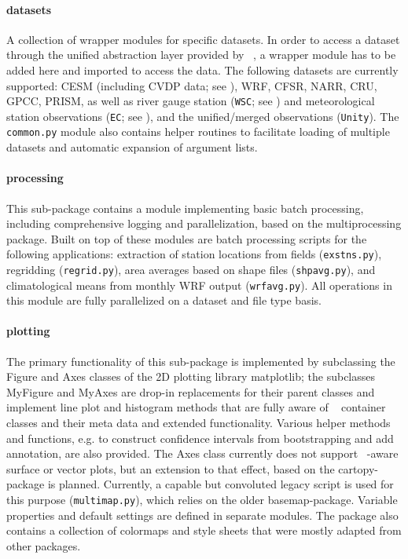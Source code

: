 \documentclass[letterpaper,12pt,headsepline,final]{scrartcl} %
\newcommand{\geopy}{\mbox{\color{teal} \sffamily {GeoPy}}}
\begin{document}
\paragraph{\color{blue} \ttfamily datasets} A collection of wrapper modules for specific datasets. In order to access a dataset through the unified abstraction layer provided by \geopy{}, a wrapper module has to be added here and imported to access the data. The following datasets are currently supported: CESM (including CVDP data; see \citealp[][\S2.1.5]{erler2015phd}), WRF, CFSR, NARR, CRU, GPCC, PRISM, as well as river gauge station (\texttt{WSC}; see \citealp[][\S2.1.3]{erler2015phd}) and meteorological station observations (\texttt{EC}; see \citealp[][\S2.1.4]{erler2015phd}), and the unified/merged observations (\texttt{Unity}).
The \texttt{common.py} module also contains helper routines to facilitate loading of multiple datasets and automatic expansion of argument lists.

\paragraph{\color{violet} \ttfamily processing} This sub-package contains a module implementing basic batch processing, including comprehensive logging and parallelization, based on the \textsf{multiprocessing} package. Built on top of these modules are batch processing scripts for the following applications: extraction of station locations from fields (\texttt{exstns.py}), regridding (\texttt{regrid.py}), area averages based on shape files (\texttt{shpavg.py}), and climatological means from monthly WRF output (\texttt{wrfavg.py}). All operations in this module are fully parallelized on a dataset and file type basis.

\paragraph{\color{purple} \ttfamily plotting} The primary functionality of this sub-package is implemented by subclassing the \textsf{Figure} and \textsf{Axes} classes of the 2D plotting library \textsf{matplotlib}; the subclasses \textsf{MyFigure} and \textsf{MyAxes} are drop-in replacements for their parent classes and implement line plot and histogram methods that are fully aware of \geopy{} container classes and their meta data and extended functionality. Various helper methods and functions, e.g. to construct confidence intervals from bootstrapping and add annotation, are also provided.
The \textsf{Axes} class currently does not support \geopy{}-aware surface or vector plots, but an extension to that effect, based on the \textsf{cartopy}-package is planned. Currently, a capable but convoluted legacy script is used for this purpose (\texttt{multimap.py}), which relies on the older \textsf{basemap}-package.
Variable properties and default settings are defined in separate modules.
The package also contains a collection of colormaps and style sheets that were mostly adapted from other packages.
\end{document}
